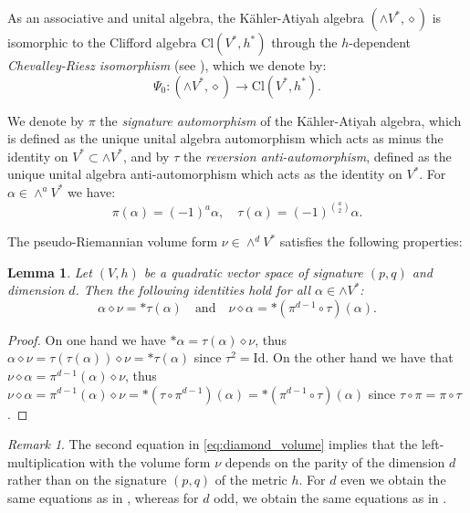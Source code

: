 \documentclass[10pt,a4paper,twoside,reqno]{amsart}
\theoremstyle{plain}
\newtheorem{lemma}[thm]{Lemma}
\theoremstyle{definition}
\theoremstyle{remark}
\newtheorem{remark}[thm]{Remark}
\def\Id{\mathrm{Id}}
\begin{document}
As an associative and unital algebra, the Kähler-Atiyah algebra $(\wedge V^*,\diamond)$ is isomorphic to the Clifford algebra $\mathrm{Cl}(V^*,h^*)$ through the $h$-dependent \emph{Chevalley-Riesz isomorphism} (see \cite{CLS21,LBC13,LBC16}), which we denote by: \begin{equation}\label{eq:ChevRiesz_iso}
    \Psi_0\colon(\wedge V^*,\diamond)\to\mathrm{Cl}(V^*,h^*).
\end{equation}

We denote by $\pi$ the \emph{signature automorphism} of the Kähler-Atiyah algebra, which is defined as the unique unital algebra automorphism which acts as minus the identity on $V^*\subset\wedge V^*$, and by $\tau$ the \emph{reversion anti-automorphism}, defined as the unique unital algebra anti-automorphism which acts as the identity on $V^*$. For $\alpha\in\wedge^aV^*$ we have: \begin{equation*}
    \pi(\alpha)=(-1)^a\alpha,\quad\tau(\alpha)=(-1)^{\binom{a}{2}}\alpha.
\end{equation*}

The pseudo-Riemannian volume form $\nu\in\wedge^dV^*$ satisfies the following properties:

\begin{lemma}\label{lemma:product_volume_form}
Let $(V,h)$ be a quadratic vector space of signature $(p,q)$ and dimension $d$. Then the following identities hold for all $\alpha\in\wedge V^*$: \begin{equation}\label{eq:diamond_volume}
\alpha\diamond\nu=*\tau(\alpha)\quad\text{and}\quad\nu\diamond\alpha=*(\pi^{d-1}\circ\tau)(\alpha).
\end{equation}
\end{lemma}

\begin{proof}
On one hand we have $*\alpha=\tau(\alpha)\diamond\nu$, thus $\alpha\diamond\nu=\tau(\tau(\alpha))\diamond\nu=*\tau(\alpha)$ since $\tau^2=\Id$. On the other hand we have that $\nu\diamond\alpha=\pi^{d-1}(\alpha)\diamond\nu$, thus $\nu\diamond\alpha=\pi^{d-1}(\alpha)\diamond\nu=*(\tau\circ\pi^{d-1})(\alpha)=*(\pi^{d-1}\circ\tau)(\alpha)$ since $\tau\circ\pi=\pi\circ\tau$.
\end{proof}

\begin{remark}
The second equation in \eqref{eq:diamond_volume} implies that the left-multiplication with the volume form $\nu$ depends on the parity of the dimension $d$ rather than on the signature $(p,q)$ of the metric $h$. For $d$ even we obtain the same equations as in \cite[Lemma 3.24]{CLS21}, whereas for $d$ odd, we obtain the same equations as in \cite[Equation 4]{Sha24}.
\end{remark}




\end{document}
